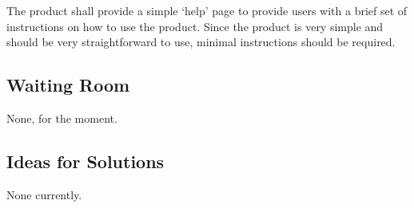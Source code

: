 \documentclass[12pt, titlepage]{article}
\begin{document}
The product shall provide a simple ‘help’ page to provide users with a brief set of instructions on how to use the product.  Since the product is very simple and should be very straightforward to use, minimal instructions should be required.

\subsection{Waiting Room}

None, for the moment.

\subsection{Ideas for Solutions}
None currently.
\end{document}
